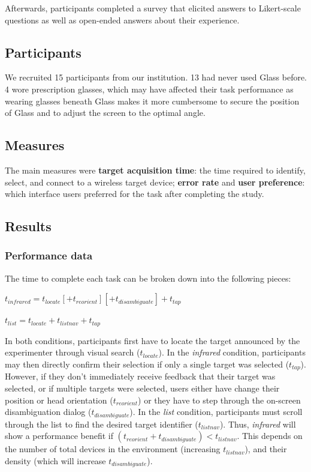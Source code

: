 Afterwards, participants completed a survey that elicited answers to Likert-scale questions as well as open-ended answers about their experience.

\subsection{Participants}
We recruited 15 participants from our institution. 13 had never used Glass before. 4 wore prescription glasses, which may have affected their task performance as wearing glasses beneath Glass makes it more cumbersome to secure the position of Glass and to adjust the screen to the optimal angle.

\subsection{Measures}
The main measures were {\bf target acquisition time}: the time required to identify, select, and connect to a wireless target device; {\bf error rate} and {\bf user preference}: which interface users preferred for the task after completing the study.

\subsection{Results}
\subsubsection{Performance data}
The time to complete each task can be broken down into the following pieces:

$t_{infrared}=t_{locate}[+t_{reorient}][+t_{disambiguate}]+t_{tap}$

$t_{list}=t_{locate}+t_{listnav}+t_{tap}$

In both conditions, participants first have to locate the target announced by the experimenter through visual search ($t_{locate}$). In the {\em infrared} condition, participants may then directly confirm their selection if only a single target was selected ($t_{tap}$). However, if they don't immediately receive feedback that their target was selected, or if multiple targets were selected, users either have change their position or head orientation ($t_{reorient}$) or they have to step through the on-screen disambiguation dialog ($t_{disambiguate}$). In the {\em list} condition, participants must scroll through the list to find the desired target identifier ($t_{listnav}$).
Thus, {\em infrared} will show a performance benefit if $(t_{reorient}+t_{disambiguate})<t_{listnav}$. This depends on the number of total devices in the environment (increasing $t_{listnav}$), and their density (which will increase $t_{disambiguate}$). 

